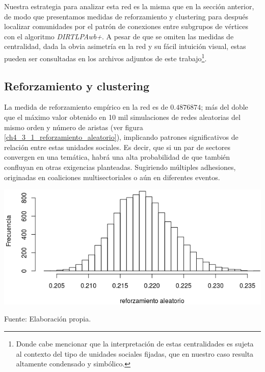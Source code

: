 \documentclass[letterpaper, 11pt]{book}
\theoremstyle{definition}
\theoremstyle{remark}
\begin{document}
Nuestra estrategia para analizar esta red es la misma que en la sección anterior, de modo que presentamos medidas de reforzamiento y clustering para después localizar comunidades por el patrón de conexiones entre subgrupos de vértices con el algoritmo \emph{DIRTLPAwb+}. 
A pesar de que se omiten las medidas de centralidad, dada la obvia asimetría en la red y su fácil intuición visual, estas pueden ser consultadas en los archivos adjuntos de este trabajo\footnote{
    Donde cabe mencionar que la interpretación de estas centralidades es sujeta al contexto del tipo de unidades sociales fijadas, que en nuestro caso resulta altamente condensado y simbólico. 
}.






\subsection{Reforzamiento y clustering}
\label{subsec:Reforzamiento_TiposCat}


La medida de reforzamiento empírico en la red es de $0.4876874$; más del doble que el máximo valor obtenido en 10 mil simulaciones de redes aleatorias del mismo orden y número de aristas (ver figura \ref{ch4_3_1_reforzamiento_aleatorio}), implicando patrones significativos de relación entre estas unidades sociales. 
Es decir, que si un par de sectores convergen en una temática, habrá una alta probabilidad de que también confluyan en otras exigencias planteadas. 
Sugiriendo múltiples adhesiones, originadas en coaliciones multisectoriales o aún en diferentes eventos. 


\hspace{-1em}\begin{minipage}{\linewidth}
\centering
{} \label{ch4_3_1_reforzamiento_aleatorio}
\includegraphics[scale=0.7]{img/4.14_reforzamiento_aleatorio.png}
\par\bigskip
\small Fuente: Elaboración propia.
\end{minipage}\bigskip
\end{document}
